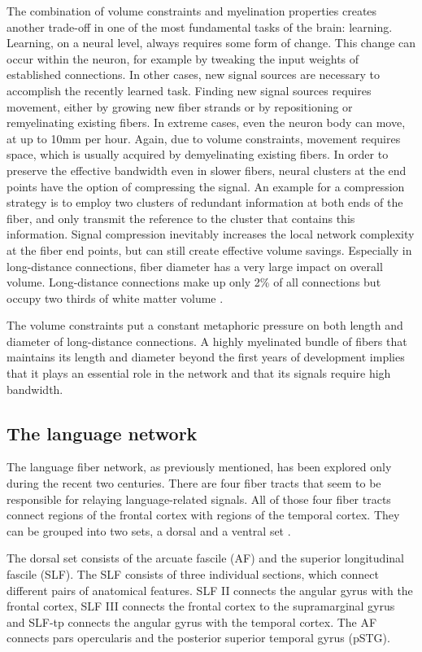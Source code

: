 The combination of volume constraints and myelination properties creates another trade-off in one of the most fundamental tasks of the brain: learning.
Learning, on a neural level, always requires some form of change.
This change can occur within the neuron, for example by tweaking the input weights of established connections.
In other cases, new signal sources are necessary to accomplish the recently learned task.
Finding new signal sources requires movement, either by growing new fiber strands or by repositioning or remyelinating existing fibers.
In extreme cases, even the neuron body can move, at up to 10mm per hour.
Again, due to volume constraints, movement requires space, which is usually acquired by demyelinating existing fibers.
In order to preserve the effective bandwidth even in slower fibers, neural clusters at the end points have the option of compressing the signal.
An example for a compression strategy is to employ two clusters of redundant information at both ends of the fiber, and only transmit the reference to the cluster that contains this information.
Signal compression inevitably increases the local network complexity at the fiber end points, but can still create effective volume savings.
Especially in long-distance connections, fiber diameter has a very large impact on overall volume.
Long-distance connections make up only 2\% of all connections but occupy two thirds of white matter volume \cite{1.1.fiberstats}.

The volume constraints put a constant metaphoric pressure on both length and diameter of long-distance connections.
A highly myelinated bundle of fibers that maintains its length and diameter beyond the first years of development implies that it plays an essential role in the network and that its signals require high bandwidth.

\subsection{The language network}
The language fiber network, as previously mentioned, has been explored only during the recent two centuries.
There are four fiber tracts that seem to be responsible for relaying language-related signals.
All of those four fiber tracts connect regions of the frontal cortex with regions of the temporal cortex.
They can be grouped into two sets, a dorsal and a ventral set \cite{1.1.Gierhan}.

The dorsal set consists of the arcuate fascile (AF) and the superior longitudinal fascile (SLF).
The SLF consists of three individual sections, which connect different pairs of anatomical features.
SLF II connects the angular gyrus with the frontal cortex, SLF III connects the frontal cortex to the supramarginal gyrus and SLF-tp connects the angular gyrus with the temporal cortex.
The AF connects pars opercularis and the posterior superior temporal gyrus (pSTG).

